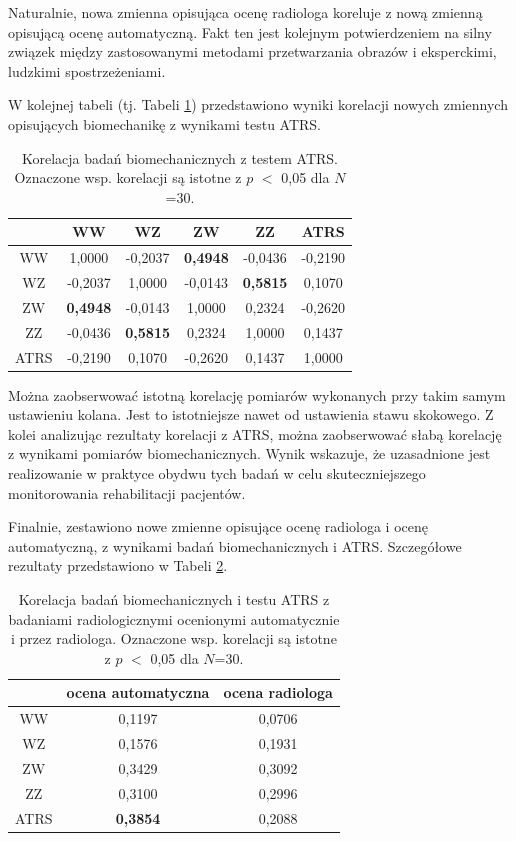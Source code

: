 Naturalnie, nowa zmienna opisująca ocenę radiologa koreluje z nową zmienną opisującą ocenę automatyczną. Fakt ten jest kolejnym potwierdzeniem na silny związek między zastosowanymi metodami przetwarzania obrazów i eksperckimi, ludzkimi spostrzeżeniami. 

W kolejnej tabeli (tj. Tabeli \ref{tab:bioVSatrs}) przedstawiono wyniki korelacji nowych zmiennych opisujących biomechanikę z wynikami testu ATRS. 

\begin{table}[h]
	\centering
	\setlength{\tabcolsep}{3pt}
	\setlength\extrarowheight{2pt}
	\caption{Korelacja badań biomechanicznych z testem ATRS. Oznaczone wsp. korelacji są istotne z $p$ $<$ 0,05 dla $N$=30.}
	\label{tab:bioVSatrs}
	\begin{tabular}{c|c|c|c|c|c}
		&WW&WZ&ZW&ZZ&ATRS \\
		\hline \hline
		WW&1,0000&-0,2037&\textbf{0,4948}&-0,0436&-0,2190\\
		\hline
		WZ&-0,2037&1,0000&-0,0143&\textbf{0,5815}&0,1070\\
		\hline
		ZW&\textbf{0,4948}&-0,0143&1,0000&0,2324&-0,2620\\
		\hline
		ZZ&-0,0436&\textbf{0,5815}&0,2324&1,0000&0,1437\\
		\hline
		ATRS&-0,2190&0,1070&-0,2620&0,1437&1,0000\\
		
		
	\end{tabular}
\end{table}

Można zaobserwować istotną korelację pomiarów wykonanych przy takim samym ustawieniu kolana. Jest to istotniejsze nawet od ustawienia stawu skokowego. Z kolei analizując rezultaty korelacji z ATRS, można zaobserwować słabą korelację z wynikami pomiarów biomechanicznych. Wynik wskazuje, że uzasadnione jest realizowanie w praktyce obydwu tych badań w celu skuteczniejszego monitorowania rehabilitacji pacjentów.

Finalnie, zestawiono nowe zmienne opisujące ocenę radiologa i ocenę automatyczną, z wynikami badań biomechanicznych i ATRS. Szczegółowe rezultaty przedstawiono w Tabeli \ref{tab:bioATRSvspredGT}.

\begin{table}[h]
	\centering
	\setlength{\tabcolsep}{3pt}
	\setlength\extrarowheight{2pt}
	\caption{Korelacja badań biomechanicznych i testu ATRS z badaniami radiologicznymi ocenionymi automatycznie i przez radiologa. Oznaczone wsp. korelacji są istotne z $p$ $<$ 0,05 dla $N$=30.}
	\label{tab:bioATRSvspredGT}
	\begin{tabular}{c|c|c}
		&ocena automatyczna&ocena radiologa \\
		\hline \hline
		WW&0,1197&0,0706\\
		\hline
		WZ&0,1576&0,1931\\
		\hline
		ZW&0,3429&0,3092\\
		\hline
		ZZ&0,3100&0,2996\\
		\hline
		ATRS&\textbf{0,3854}&0,2088\\
		
	
	\end{tabular}
\end{table}


